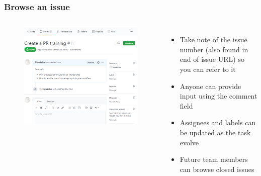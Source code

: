\documentclass[aspectratio=169]{beamer} %
\begin{document}
\begin{frame}
	\frametitle{Browse an issue}
	\begin{columns}[c]

		\vspace{-.5cm}
		\begin{figure}
			\centering
			\includegraphics[width=\textwidth]{./img/create-issue-2.png}
		\end{figure}


		\begin{itemize}
			\setlength\itemsep{1em}
			\item Take note of the issue number
			(also found in end of issue URL)
			so you can refer to it
			\item Anyone can provide input using the comment field
			\item Assignees and labels can be updated as the task evolve
			\item Future team members can browse closed issues
		\end{itemize}

	\end{columns}
\end{frame}
\end{document}

